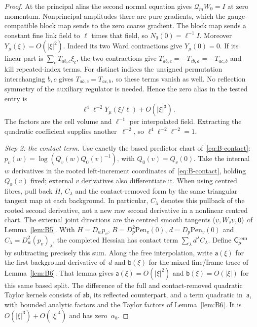 \begin{proof}
At the principal alias the second normal equation gives $\mathcal Q_mW_0=I$ at zero momentum. Nonprincipal amplitudes there are pure gradients, which the gauge-compatible block map sends to the zero coarse gradient. The block map sends a constant fine link field to $\ell$ times that field, so $N_0(0)=\ell^{-1}I$. Moreover $Y_\mu(\xi)=O(|\xi|^2)$. Indeed its two Ward contractions give $Y_\mu(0)=0$. If its linear part is $\sum_c T_{ab,c}\xi_c$, the two contractions give $T_{ab,c}=-T_{cb,a}=-T_{ac,b}$ and kill repeated-index terms. For distinct indices the unsigned permutation interchanging $b,c$ gives $T_{ab,c}=T_{ac,b}$, so these terms vanish as well. No reflection symmetry of the auxiliary regulator is needed. Hence the zero alias in the tested entry is
\begin{equation*}
\ell^4\ell^{-2}Y_\mu(\xi/\ell)+O(|\xi|^3)\,.
\end{equation*}
The factors are the cell volume and $\ell^{-1}$ per interpolated field. Extracting the quadratic coefficient supplies another~$\ell^{-2}$, so $\ell^4\ell^{-2}\ell^{-2}=1$.

\emph{Step 2: the contact term.} Use exactly the based predictor chart of~\eqref{eq:B-contact}: $p_v(w)=\log(Q_v(w)Q_0(v)^{-1})$, with $Q_0(v)=Q_v(0)$. Take the internal $w$ derivatives in the rooted left-increment coordinates of~\eqref{eq:B-contact}, holding $Q_0(v)$ fixed; external $v$ derivatives also differentiate it. When using centred fibres, pull back $H$, $C_\lambda$ and the contact-removed form by the same triangular tangent map at each background. In particular, $C_\lambda$ denotes this pullback of the rooted second derivative, not a new raw second derivative in a nonlinear centred chart. The external joint directions are the centred smooth tangents $(v,W_{\rm s}v,0)$ of Lemma~\ref{lem:B5}. With $H=D_wp_v$, $B=D_p^2\mathrm{Pen}_v(0)$, $d=D_p\mathrm{Pen}_v(0)$ and $C_\lambda=D_w^2(p_v)_\lambda$, the completed Hessian has contact term $\sum_\lambda d^\lambda C_\lambda$. Define $\mathsf C^{\rm rem}_\mu$ by subtracting precisely this sum. Along the free interpolation, write $\mathsf a(\xi)$ for the first background derivative of~$d$ and $\mathsf b(\xi)$ for the mixed fine/frame trace of Lemma~\ref{lem:B6}. That lemma gives $\mathsf a(\xi)=O(|\xi|^2)$ and $\mathsf b(\xi)=O(|\xi|)$ for this same based split. The difference of the full and contact-removed quadratic Taylor kernels consists of $\mathsf a\mathsf b$, its reflected counterpart, and a term quadratic in~$\mathsf a$, with bounded analytic factors and the Taylor factors of Lemma~\ref{lem:B6}. It is $O(|\xi|^3)+O(|\xi|^4)$ and has zero~$\alpha_b$.


\end{proof}
